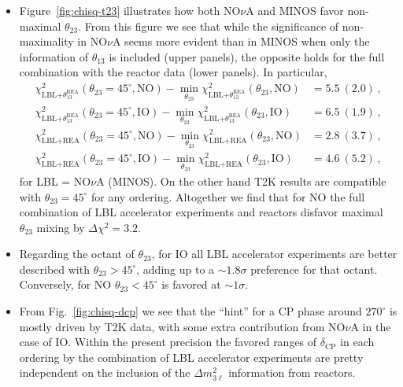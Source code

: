 \documentclass[a4paper, 11pt]{article}
\newcommand{\Dmq}{\Delta m^2}
\begin{document}
\begin{itemize}
\item Figure~\ref{fig:chisq-t23} illustrates how both NO$\nu$A and
  MINOS favor non-maximal $\theta_{23}$.  From this figure we see that
  while the significance of non-maximality in NO$\nu$A seems more
  evident than in MINOS when only the information of $\theta_{13}$ is
  included (upper panels), the opposite holds for the full combination
  with the reactor data (lower panels). In particular,
  \begin{equation}
    \begin{aligned}
      \chi^2_\text{LBL+$\theta_{13}^\text{REA}$}(\theta_{23}=45^\circ,\text{NO})
      - \min_{\theta_{23}}
        \chi^2_\text{LBL+$\theta_{13}^\text{REA}$}(\theta_{23},\text{NO})
      &= 5.5~(2.0) \,,
      \\
      \chi^2_\text{LBL+$\theta_{13}^\text{REA}$}(\theta_{23}=45^\circ,\text{IO})
      - \min_{\theta_{23}}
        \chi^2_\text{LBL+$\theta_{13}^\text{REA}$}(\theta_{23},\text{IO})
      &= 6.5~(1.9) \,,
      \\
      \chi^2_\text{LBL+REA}(\theta_{23}=45^\circ,\text{NO})
      - \min_{\theta_{23}}
        \chi^2_\text{LBL+REA}(\theta_{23},\text{NO})
      &= 2.8~(3.7) \,,
      \\
      \chi^2_\text{LBL+REA}(\theta_{23}=45^\circ,\text{IO})
      - \min_{\theta_{23}}
        \chi^2_\text{LBL+REA}(\theta_{23},\text{IO})
      &= 4.6~(5.2) \,,
    \end{aligned}
  \end{equation}
  for LBL = NO$\nu$A (MINOS).  On the other hand T2K results are
  compatible with $\theta_{23} = 45^\circ$ for any
  ordering. Altogether we find that for NO the full combination of LBL
  accelerator experiments and reactors disfavor maximal $\theta_{23}$
  mixing by $\Delta\chi^2 = 3.2$.

\item Regarding the octant of $\theta_{23}$, for IO all LBL
  accelerator experiments are better described with $\theta_{23} >
  45^\circ$, adding up to a $\sim 1.8\sigma$ preference for that
  octant. Conversely, for NO $\theta_{23} < 45^\circ$ is favored at
  $\sim 1\sigma$.

\item From Fig.~\ref{fig:chisq-dcp} we see that the ``hint'' for a CP
  phase around $270^\circ$ is mostly driven by T2K data, with some
  extra contribution from NO$\nu$A in the case of IO.  Within the
  present precision the favored ranges of $\delta_\text{CP}$ in each
  ordering by the combination of LBL accelerator experiments are
  pretty independent on the inclusion of the $\Dmq_{3\ell}$
  information from reactors.
\end{itemize}
\end{document}
